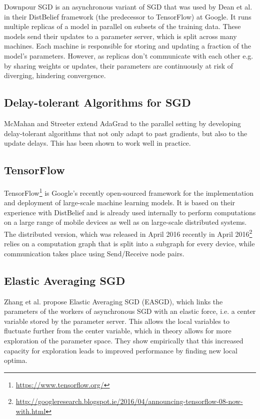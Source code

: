 \documentclass{article}
\begin{document}
Downpour SGD is an asynchronous variant of SGD that was used by Dean et al. \cite{Dean2012} in their DistBelief framework (the predecessor to TensorFlow) at Google. It runs multiple replicas of a model in parallel on subsets of the training data. These models send their updates to a parameter server, which is split across many machines. Each machine is responsible for storing and updating a fraction of the model's parameters. However, as replicas don't communicate with each other e.g. by sharing weights or updates, their parameters are continuously at risk of diverging, hindering convergence.

\subsection{Delay-tolerant Algorithms for SGD}

McMahan and Streeter \cite{Mcmahan2014} extend AdaGrad to the parallel setting by developing delay-tolerant algorithms that not only adapt to past gradients, but also to the update delays. This has been shown to work well in practice.

\subsection{TensorFlow}

TensorFlow\footnote{\url{https://www.tensorflow.org/}} \cite{Abadi2015a} is Google's recently open-sourced framework for the implementation and deployment of large-scale machine learning models. It is based on their experience with DistBelief and is already used internally to perform computations on a large range of mobile devices as well as on large-scale distributed systems. The distributed version, which was released in April 2016 recently in April 2016\footnote{\url{http://googleresearch.blogspot.ie/2016/04/announcing-tensorflow-08-now-with.html}} relies on a computation graph that is split into a subgraph for every device, while communication takes place using Send/Receive node pairs.

\subsection{Elastic Averaging SGD}

Zhang et al. \cite{Zhang2014} propose Elastic Averaging SGD (EASGD), which links the parameters of the workers of asynchronous SGD with an elastic force, i.e. a center variable stored by the parameter server. This allows the local variables to fluctuate further from the center variable, which in theory allows for more exploration of the parameter space. They show empirically that this increased capacity for exploration leads to improved performance by finding new local optima.
\end{document}
